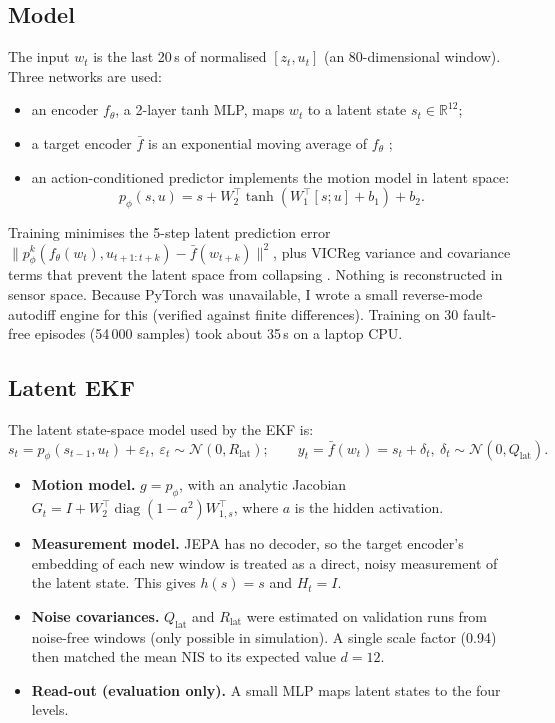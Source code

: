 \documentclass[11pt]{article}
\newcommand{\R}{\mathbb{R}}
\begin{document}
\subsection{Model}
The input $w_t$ is the last 20\,s of normalised $[z_t,u_t]$ (an 80-dimensional window). Three networks are used:
\begin{itemize}\itemsep0pt
\item an encoder $f_\theta$, a 2-layer tanh MLP, maps $w_t$ to a latent state $s_t\in\R^{12}$;
\item a target encoder $\bar f$ is an exponential moving average of $f_\theta$ \cite{grill2020byol};
\item an action-conditioned predictor implements the motion model in latent space:
\begin{equation}
p_\phi(s,u)=s+W_2^\top\tanh(W_1^\top[s;u]+b_1)+b_2 .
\end{equation}
\end{itemize}
Training minimises the 5-step latent prediction error $\|p_\phi^{k}(f_\theta(w_t),u_{t+1:t+k})-\bar f(w_{t+k})\|^2$, plus VICReg variance and covariance terms that prevent the latent space from collapsing \cite{bardes2022vicreg}. Nothing is reconstructed in sensor space. Because PyTorch was unavailable, I wrote a small reverse-mode autodiff engine for this (verified against finite differences). Training on 30 fault-free episodes (54\,000 samples) took about 35\,s on a laptop CPU.

\subsection{Latent EKF}
The latent state-space model used by the EKF is:
\begin{equation}
s_t=p_\phi(s_{t-1},u_t)+\varepsilon_t,\ \varepsilon_t\sim\mathcal N(0,R_{\text{lat}});\qquad y_t=\bar f(w_t)=s_t+\delta_t,\ \delta_t\sim\mathcal N(0,Q_{\text{lat}}).
\end{equation}
\begin{itemize}\itemsep0pt
\item \textbf{Motion model.} $g=p_\phi$, with an analytic Jacobian $G_t=I+W_2^\top\operatorname{diag}(1-a^2)W_{1,s}^\top$, where $a$ is the hidden activation.
\item \textbf{Measurement model.} JEPA has no decoder, so the target encoder's embedding of each new window is treated as a direct, noisy measurement of the latent state. This gives $h(s)=s$ and $H_t=I$.
\item \textbf{Noise covariances.} $Q_{\text{lat}}$ and $R_{\text{lat}}$ were estimated on validation runs from noise-free windows (only possible in simulation). A single scale factor (0.94) then matched the mean NIS to its expected value $d=12$.
\item \textbf{Read-out (evaluation only).} A small MLP maps latent states to the four levels.
\end{itemize}
\end{document}
